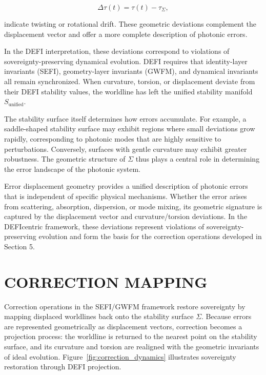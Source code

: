 \documentclass[aip,adv,reprint,floatfix]{revtex4-2}
\begin{document}
\[
\Delta\tau(t) = \tau(t) - \tau_{\Sigma},
\]


indicate twisting or rotational drift.\cite{DuttonElectronField2026}
These geometric deviations complement the displacement vector and offer a
more complete description of photonic errors.

In the DEFI interpretation, these deviations correspond to violations of sovereignty-preserving dynamical
evolution.\cite{DuttonSEFI2026} DEFI requires that identity-layer invariants
(SEFI), geometry-layer invariants (GWFM), and dynamical invariants all remain synchronized. When curvature,
torsion, or displacement deviate from their DEFI stability values, the worldline has left the unified stability
manifold $S_{\mathrm{unified}}$.

The stability surface itself determines how errors accumulate. For example, a saddle-shaped stability surface
may exhibit regions where small deviations grow rapidly,
corresponding to photonic modes that are highly sensitive to perturbations. Conversely, surfaces with gentle
curvature may exhibit greater robustness.\cite{DuttonElectronField2026}
The geometric structure of $\Sigma$ thus plays a central role in determining
the error landscape of the photonic system.

Error displacement geometry provides a unified description of photonic errors that is independent of specific physical mechanisms.\cite{DuttonElectronField2026}
Whether the error arises
from scattering, absorption, dispersion, or mode mixing,
its geometric signature is captured by the displacement
vector and curvature/torsion deviations. In the DEFIcentric framework, these deviations represent violations
of sovereignty-preserving evolution and form the basis for
the correction operations developed in Section 5.
\section{CORRECTION MAPPING}

Correction operations in the SEFI/GWFM framework
restore sovereignty by mapping displaced worldlines back
onto the stability surface $\Sigma$.\cite{DuttonSEFI2026,DuttonElectronField2026}
Because errors are represented geometrically as displacement vectors, correction
becomes a projection process: the worldline is returned
to the nearest point on the stability surface, and its curvature and torsion are realigned with the geometric invariants of ideal evolution. Figure~\ref{fig:correction_dynamics}
illustrates sovereignty restoration through DEFI projection.
\end{document}
